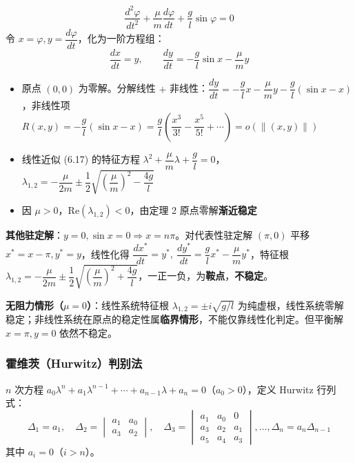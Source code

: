 \begin{example}[有阻力的数学摆]
\begin{equation}\frac{d^2\varphi}{dt^2} + \frac{\mu}{m}\frac{d\varphi}{dt} + \frac{g}{l}\sin\varphi = 0 \tag{6.15}\end{equation}
令 $x = \varphi, y = \dfrac{d\varphi}{dt}$，化为一阶方程组：
\begin{equation}\frac{dx}{dt} = y, \qquad \frac{dy}{dt} = -\frac{g}{l}\sin x - \frac{\mu}{m}y \tag{6.16}\end{equation}
\end{example}

\begin{itemize}
    \item 原点 $(0,0)$ 为零解。分解线性 $+$ 非线性：$\dfrac{dy}{dt} = -\dfrac{g}{l}x - \dfrac{\mu}{m}y - \dfrac{g}{l}(\sin x - x)$，非线性项 $R(x,y) = -\dfrac{g}{l}(\sin x - x) = \dfrac{g}{l}\left(\dfrac{x^3}{3!} - \dfrac{x^5}{5!} + \cdots\right) = o(\|(x,y)\|)$
    \item 线性近似 (6.17) 的特征方程 $\lambda^2 + \dfrac{\mu}{m}\lambda + \dfrac{g}{l} = 0$，$\lambda_{1,2} = -\dfrac{\mu}{2m} \pm \dfrac{1}{2}\sqrt{\left(\dfrac{\mu}{m}\right)^2 - \dfrac{4g}{l}}$
    \item 因 $\mu > 0$，$\mathrm{Re}(\lambda_{1,2}) < 0$，由定理 2 原点零解\textbf{渐近稳定}
\end{itemize}

\textbf{其他驻定解}：$y = 0, \sin x = 0 \Rightarrow x = n\pi$。对代表性驻定解 $(\pi, 0)$ 平移 $x^* = x - \pi, y^* = y$，线性化得 $\dfrac{dx^*}{dt} = y^*, \ \dfrac{dy^*}{dt} = \dfrac{g}{l}x^* - \dfrac{\mu}{m}y^*$，特征根 $\lambda_{1,2} = -\dfrac{\mu}{2m} \pm \dfrac{1}{2}\sqrt{\left(\dfrac{\mu}{m}\right)^2 + \dfrac{4g}{l}}$，一正一负，为\textbf{鞍点}，\textbf{不稳定}。

\textbf{无阻力情形（$\mu = 0$）}：线性系统特征根 $\lambda_{1,2} = \pm i\sqrt{g/l}$ 为纯虚根，线性系统零解稳定；非线性系统在原点的稳定性属\textbf{临界情形}，不能仅靠线性化判定。但平衡解 $x = \pi, y = 0$ 依然不稳定。

\subsubsection{霍维茨（Hurwitz）判别法}

$n$ 次方程 $a_0\lambda^n + a_1\lambda^{n-1} + \cdots + a_{n-1}\lambda + a_n = 0$（$a_0 > 0$），定义 Hurwitz 行列式：
$$\Delta_1 = a_1, \quad \Delta_2 = \begin{vmatrix} a_1 & a_0 \\ a_3 & a_2 \end{vmatrix}, \quad \Delta_3 = \begin{vmatrix} a_1 & a_0 & 0 \\ a_3 & a_2 & a_1 \\ a_5 & a_4 & a_3 \end{vmatrix}, \ldots, \Delta_n = a_n\Delta_{n-1}$$
其中 $a_i = 0$（$i > n$）。

